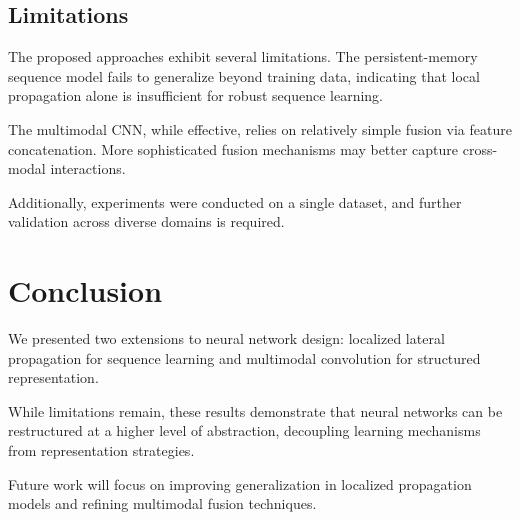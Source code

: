 \documentclass{article}
\begin{document}
	\subsection{Limitations}
	
	The proposed approaches exhibit several limitations. The persistent-memory sequence model fails to generalize beyond training data, indicating that local propagation alone is insufficient for robust sequence learning.
	
	The multimodal CNN, while effective, relies on relatively simple fusion via feature concatenation. More sophisticated fusion mechanisms may better capture cross-modal interactions.
	
	Additionally, experiments were conducted on a single dataset, and further validation across diverse domains is required.
	
	\section{Conclusion}
	
	We presented two extensions to neural network design: localized lateral propagation for sequence learning and multimodal convolution for structured representation.
	
	While limitations remain, these results demonstrate that neural networks can be restructured at a higher level of abstraction, decoupling learning mechanisms from representation strategies.
	
	Future work will focus on improving generalization in localized propagation models and refining multimodal fusion techniques.
	
	
	
	
\end{document}
